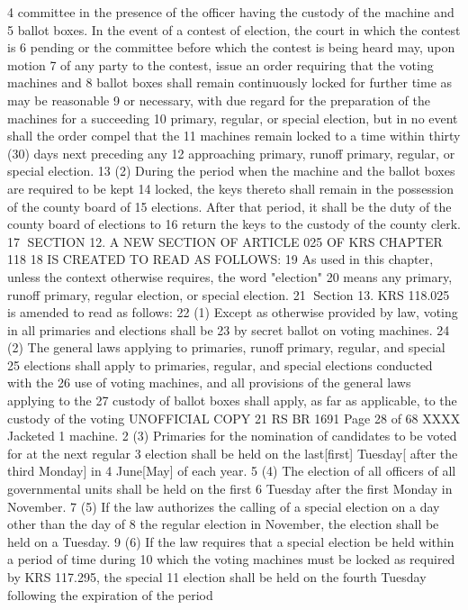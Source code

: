 4 committee in the presence of the officer having the custody of the machine and
5 ballot boxes. In the event of a contest of election, the court in which the contest is
6 pending or the committee before which the contest is being heard may, upon motion
7 of any party to the contest, issue an order requiring that the voting machines and
8 ballot boxes shall remain continuously locked for further time as may be reasonable
9 or necessary, with due regard for the preparation of the machines for a succeeding
10 primary, regular, or special election, but in no event shall the order compel that the
11 machines remain locked to a time within thirty (30) days next preceding any
12 approaching primary, runoff primary, regular, or special election.
13 (2) During the period when the machine and the ballot boxes are required to be kept
14 locked, the keys thereto shall remain in the possession of the county board of
15 elections. After that period, it shall be the duty of the county board of elections to
16 return the keys to the custody of the county clerk.
17 SECTION 12. A NEW SECTION OF ARTICLE 025 OF KRS CHAPTER 118
18 IS CREATED TO READ AS FOLLOWS:
19 As used in this chapter, unless the context otherwise requires, the word "election"
20 means any primary, runoff primary, regular election, or special election.
21 Section 13. KRS 118.025 is amended to read as follows:
22 (1) Except as otherwise provided by law, voting in all primaries and elections shall be
23 by secret ballot on voting machines.
24 (2) The general laws applying to primaries, runoff primary, regular, and special
25 elections shall apply to primaries, regular, and special elections conducted with the
26 use of voting machines, and all provisions of the general laws applying to the
27 custody of ballot boxes shall apply, as far as applicable, to the custody of the voting 
UNOFFICIAL COPY 21 RS BR 1691
Page 28 of 68
XXXX Jacketed
1 machine.
2 (3) Primaries for the nomination of candidates to be voted for at the next regular
3 election shall be held on the last[first] Tuesday[ after the third Monday] in
4 June[May] of each year.
5 (4) The election of all officers of all governmental units shall be held on the first
6 Tuesday after the first Monday in November.
7 (5) If the law authorizes the calling of a special election on a day other than the day of
8 the regular election in November, the election shall be held on a Tuesday.
9 (6) If the law requires that a special election be held within a period of time during
10 which the voting machines must be locked as required by KRS 117.295, the special
11 election shall be held on the fourth Tuesday following the expiration of the period
